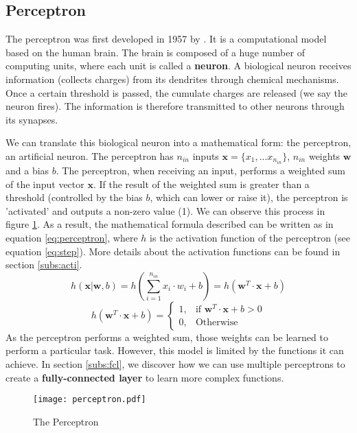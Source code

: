 \subsection{Perceptron} \label{subs:perceptron}
The perceptron was first developed in 1957 by \textcite{brain_perceptron_nodate}. It is a computational model based on the human brain. The brain is composed of a huge number of computing units, where each unit is called a \textbf{neuron}. A biological neuron receives information (collects charges) from its dendrites through chemical mechanisms. Once a certain threshold is passed, the cumulate charges are released (we say the neuron fires). The information is therefore transmitted to other neurons through its synapses.

We can translate this biological neuron into a mathematical form: the perceptron, an artificial neuron. The perceptron has $n_{in}$ inputs $\boldsymbol{x} = \{ x_1, ... x_{n_{in}} \}$, $n_{in}$ weights $\boldsymbol{w}$ and a bias $b$. The perceptron, when receiving an input, performs a weighted sum of the input vector $\boldsymbol{x}$. If the result of the weighted sum is greater than a threshold (controlled by the bias $b$, which can lower or raise it), the perceptron is 'activated' and outputs a non-zero value (1). We can observe this process in figure \ref{fig:perceptron}. As a result, the mathematical formula described can be written as in equation \eqref{eq:perceptron}, where $h$ is the activation function of the perceptron (see equation \eqref{eq:step}). More details about the activation functions can be found in section \ref{subs:acti}.
%
\begin{equation}
    h ( \boldsymbol{x} | \boldsymbol{w}, b) = h(\sum^{n_{in}}_{i=1} x_i \cdot w_i + b) = h ( \boldsymbol{w}^{T} \cdot \boldsymbol{x} + b)
    \label{eq:perceptron}
\end{equation}
%
\begin{equation}
    h ( \boldsymbol{w}^{T} \cdot \boldsymbol{x} + b) = \begin{cases} 1, & \mbox{if } \boldsymbol{w}^{T} \cdot \boldsymbol{x} + b > 0 \\ 0, & \mbox{Otherwise} \end{cases}
    \label{eq:step}
\end{equation}
%
As the perceptron performs a weighted sum, those weights can be learned to perform a particular task. However, this model is limited by the functions it can achieve. In section \ref{subs:fcl}, we discover how we can use multiple perceptrons to create a \textbf{fully-connected layer} to learn more complex functions.
%
\begin{figure}
    \centering
    \texttt{[image: perceptron.pdf]}
    \caption{The Perceptron}
    \label{fig:perceptron}
\end{figure}
